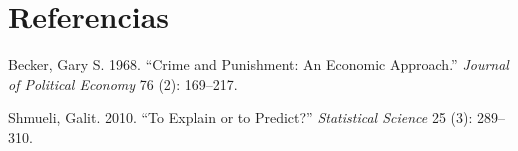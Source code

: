 \documentclass[12pt,spanish]{article}
\newlength{\cslhangindent}
\newlength{\csllabelwidth}
\newcommand{\citeproctext}{}
\newenvironment{CSLReferences}[2] 
 {\begin{list}{}{
  \setlength{\leftmargin}{\cslhangindent}
  \setlength{\parsep}{0pt}
  \setlength{\itemsep}{6pt}
  \ifodd #1
   \setlength{\leftmargin}{\leftmargin + \csllabelwidth}
   \setlength{\itemindent}{-\csllabelwidth}
  \fi
  }
  \renewcommand{\bibitem}[2][]{\item} %
 }
 {\end{list}}
\begin{document}
\section{Referencias}\label{referencias}

\protect{}\label{refs}
\begin{CSLReferences}{1}{1}
\bibitem[\citeproctext]{ref-becker1968}
Becker, Gary S. 1968. {``Crime and Punishment: An Economic Approach.''}
\emph{Journal of Political Economy} 76 (2): 169--217.

\bibitem[\citeproctext]{ref-shmueli2010}
Shmueli, Galit. 2010. {``To Explain or to Predict?''} \emph{Statistical
Science} 25 (3): 289--310.

\end{CSLReferences}
\end{document}
